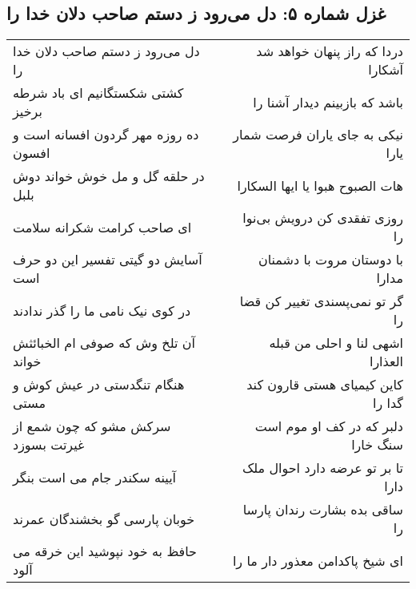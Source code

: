 \begin{center}
\section*{غزل شماره ۵: دل می‌رود ز دستم صاحب دلان خدا را}
\label{sec:sh005}
\begin{longtable}{l p{0.5cm} r}
دل می‌رود ز دستم صاحب دلان خدا را
&&
دردا که راز پنهان خواهد شد آشکارا
\\
کشتی شکستگانیم ای باد شرطه برخیز
&&
باشد که بازبینم دیدار آشنا را
\\
ده روزه مهر گردون افسانه است و افسون
&&
نیکی به جای یاران فرصت شمار یارا
\\
در حلقه گل و مل خوش خواند دوش بلبل
&&
هات الصبوح هبوا یا ایها السکارا
\\
ای صاحب کرامت شکرانه سلامت
&&
روزی تفقدی کن درویش بی‌نوا را
\\
آسایش دو گیتی تفسیر این دو حرف است
&&
با دوستان مروت با دشمنان مدارا
\\
در کوی نیک نامی ما را گذر ندادند
&&
گر تو نمی‌پسندی تغییر کن قضا را
\\
آن تلخ وش که صوفی ام الخبائثش خواند
&&
اشهی لنا و احلی من قبله العذارا
\\
هنگام تنگدستی در عیش کوش و مستی
&&
کاین کیمیای هستی قارون کند گدا را
\\
سرکش مشو که چون شمع از غیرتت بسوزد
&&
دلبر که در کف او موم است سنگ خارا
\\
آیینه سکندر جام می است بنگر
&&
تا بر تو عرضه دارد احوال ملک دارا
\\
خوبان پارسی گو بخشندگان عمرند
&&
ساقی بده بشارت رندان پارسا را
\\
حافظ به خود نپوشید این خرقه می آلود
&&
ای شیخ پاکدامن معذور دار ما را
\\
\end{longtable}
\end{center}
